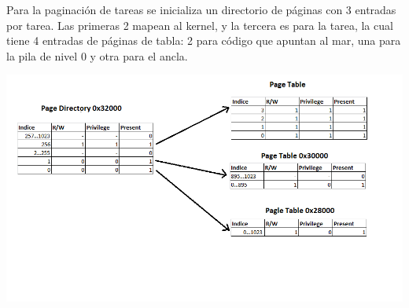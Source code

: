 Para la paginaci\'on de tareas se inicializa un directorio de p\'aginas con 3 entradas por tarea. Las primeras 2 mapean al kernel, y la tercera es para la tarea, la cual tiene 4 entradas de p\'aginas de tabla: 2 para c\'odigo que apuntan al mar, una para la pila de nivel 0 y otra para el ancla.

\includegraphics[scale=0.6]{imagenes/paginacion_tareas.png}
